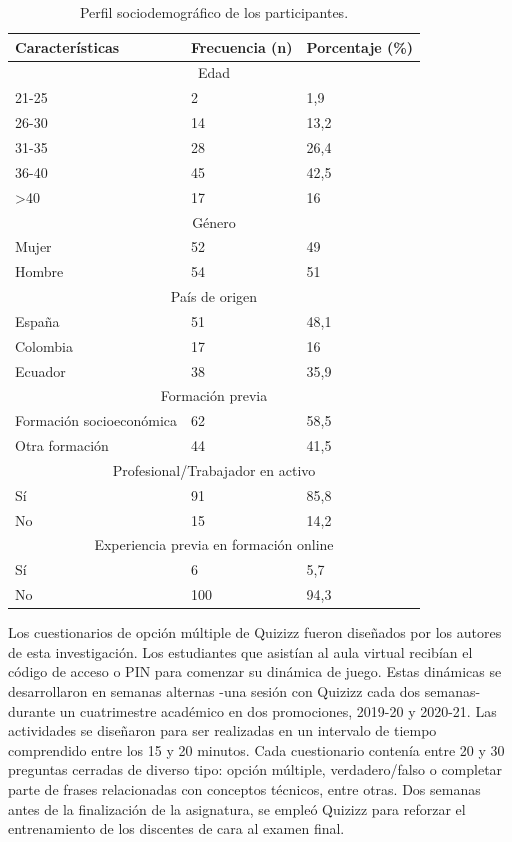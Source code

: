 \documentclass[spanish]{textolivre}
\begin{document}
\begin{table}[htpb]
\caption{Perfil sociodemográfico de los participantes.}
\label{tab1}
\centering
\begin{tabular}{lll}
\toprule 
Características	& Frecuencia (n) & Porcentaje (\%)
\\ 
\midrule
\multicolumn{3}{c}{Edad}
\\ 
\arrayrulecolor[gray]{.7}
\midrule
\arrayrulecolor{black}
21-25 & 2 & 1,9
\\
26-30 & 14 & 13,2
\\
31-35 & 28 & 26,4
\\
36-40 & 45 & 42,5
\\
>40 & 17 & 16
\\
\midrule
\multicolumn{3}{c}{Género}
\\
\arrayrulecolor[gray]{.7}
\midrule
\arrayrulecolor{black}
Mujer & 52 & 49
\\
Hombre & 54 & 51
\\
\midrule
\multicolumn{3}{c}{País de origen}
\\
\arrayrulecolor[gray]{.7}
\midrule
\arrayrulecolor{black}
España & 51 & 48,1
\\
Colombia & 17 & 16
\\
Ecuador & 38 & 35,9
\\
\midrule
\multicolumn{3}{c}{Formación previa}
\\
\arrayrulecolor[gray]{.7}
\midrule
\arrayrulecolor{black}
Formación socioeconómica & 62 & 58,5
\\
Otra formación & 44 & 41,5
\\
\midrule
\multicolumn{3}{c}{Profesional/Trabajador en activo}
\\
\arrayrulecolor[gray]{.7}
\midrule
\arrayrulecolor{black}
Sí & 91 & 85,8
\\
No & 15 & 14,2
\\
\midrule
\multicolumn{3}{c}{Experiencia previa en formación online}
\\
\arrayrulecolor[gray]{.7}
\midrule
\arrayrulecolor{black}
Sí & 6 & 5,7
\\
No & 100 & 94,3
\\ 
\bottomrule
\end{tabular}
\end{table}

Los cuestionarios de opción múltiple de Quizizz fueron diseñados por los autores de esta investigación. Los estudiantes que asistían al aula virtual recibían el código de acceso o PIN para comenzar su dinámica de juego. Estas dinámicas se desarrollaron en semanas alternas -una sesión con Quizizz cada dos semanas- durante un cuatrimestre académico en dos promociones, 2019-20 y 2020-21. Las actividades se diseñaron para ser realizadas en un intervalo de tiempo comprendido entre los 15 y 20 minutos. Cada cuestionario contenía entre 20 y 30 preguntas cerradas de diverso tipo: opción múltiple, verdadero/falso o completar parte de frases relacionadas con conceptos técnicos, entre otras. Dos semanas antes de la finalización de la asignatura, se empleó Quizizz para reforzar el entrenamiento de los discentes de cara al examen final.
\end{document}
